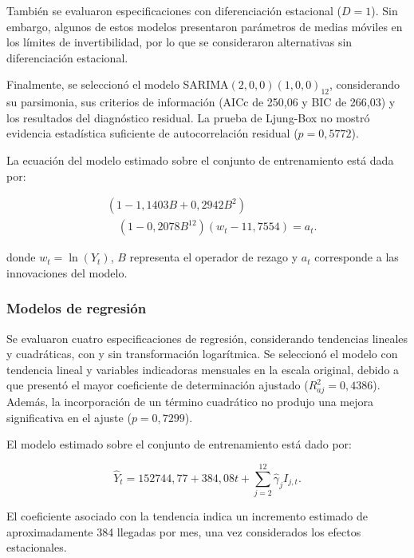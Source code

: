 \documentclass[12pt]{article}
\begin{document}
También se evaluaron especificaciones con diferenciación 
estacional ($D=1$). Sin embargo, algunos de estos modelos 
presentaron parámetros de medias móviles en los límites 
de invertibilidad, por lo que se consideraron alternativas 
sin diferenciación estacional.

Finalmente, se seleccionó el modelo 
SARIMA$(2,0,0)(1,0,0)_{12}$, considerando su parsimonia, 
sus criterios de información (AICc de 250,06 y BIC de 
266,03) y los resultados del diagnóstico residual. 
La prueba de Ljung-Box no mostró evidencia estadística 
suficiente de autocorrelación residual ($p=0,5772$).

La ecuación del modelo estimado sobre el conjunto 
de entrenamiento está dada por:

\begin{equation}
\begin{aligned}
&(1-1{,}1403B+0{,}2942B^2)\\
&\quad(1-0{,}2078B^{12})(w_t-11{,}7554)=a_t.
\end{aligned}
\label{eq:sarima_estimado}
\end{equation}

donde $w_t=\ln(Y_t)$, $B$ representa el operador de 
rezago y $a_t$ corresponde a las innovaciones del modelo.

\subsubsection{Modelos de regresión}

Se evaluaron cuatro especificaciones de regresión, 
considerando tendencias lineales y cuadráticas, con 
y sin transformación logarítmica. Se seleccionó el 
modelo con tendencia lineal y variables indicadoras 
mensuales en la escala original, debido a que presentó 
el mayor coeficiente de determinación ajustado 
($R^2_{aj}=0{,}4386$). Además, la incorporación de un término 
cuadrático no produjo una mejora significativa en el 
ajuste ($p=0,7299$).

El modelo estimado sobre el conjunto de entrenamiento 
está dado por:

\begin{equation}
\widehat{Y}_t=152744{,}77+384{,}08t+
\sum_{j=2}^{12}\widehat{\gamma}_j I_{j,t}.
\label{eq:regresion_estimada}
\end{equation}

El coeficiente asociado con la tendencia indica un 
incremento estimado de aproximadamente 384 llegadas 
por mes, una vez considerados los efectos estacionales.
\end{document}
